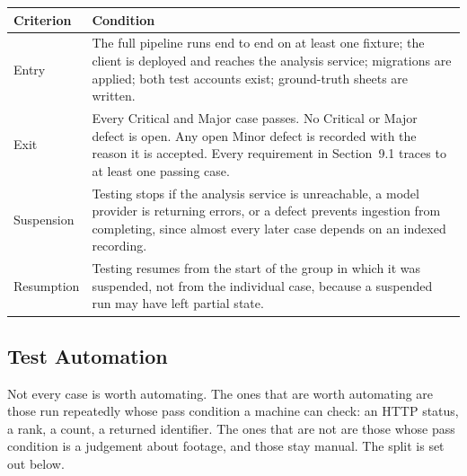 \begin{table}[htbp]
\centering
\small
\begin{tabularx}{\textwidth}{@{}L{2.8cm}X@{}}
\toprule
\textbf{Criterion} & \textbf{Condition} \\
\midrule
Entry & The full pipeline runs end to end on at least one fixture; the client is
deployed and reaches the analysis service; migrations are applied; both test accounts
exist; ground-truth sheets are written. \\
Exit & Every Critical and Major case passes. No Critical or Major defect is open. Any
open Minor defect is recorded with the reason it is accepted. Every requirement in
Section~9.1 traces to at least one passing case. \\
Suspension & Testing stops if the analysis service is unreachable, a model provider is
returning errors, or a defect prevents ingestion from completing, since almost every
later case depends on an indexed recording. \\
Resumption & Testing resumes from the start of the group in which it was suspended,
not from the individual case, because a suspended run may have left partial state. \\
\bottomrule
\end{tabularx}
\end{table}

\subsection{Test Automation}

Not every case is worth automating. The ones that are worth automating are those run
repeatedly whose pass condition a machine can check: an HTTP status, a rank, a count, a
returned identifier. The ones that are not are those whose pass condition is a judgement
about footage, and those stay manual. The split is set out below.

